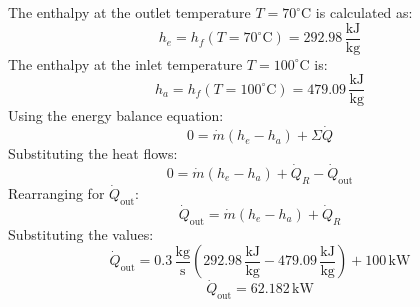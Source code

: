 The enthalpy at the outlet temperature \( T = 70^\circ\text{C} \) is calculated as:  
\[
h_e = h_f(T = 70^\circ\text{C}) = 292.98 \, \frac{\text{kJ}}{\text{kg}}
\]  
The enthalpy at the inlet temperature \( T = 100^\circ\text{C} \) is:  
\[
h_a = h_f(T = 100^\circ\text{C}) = 479.09 \, \frac{\text{kJ}}{\text{kg}}
\]  
Using the energy balance equation:  
\[
0 = \dot{m}(h_e - h_a) + \Sigma \dot{Q}
\]  
Substituting the heat flows:  
\[
0 = \dot{m}(h_e - h_a) + \dot{Q}_R - \dot{Q}_{\text{out}}
\]  
Rearranging for \( \dot{Q}_{\text{out}} \):  
\[
\dot{Q}_{\text{out}} = \dot{m}(h_e - h_a) + \dot{Q}_R
\]  
Substituting the values:  
\[
\dot{Q}_{\text{out}} = 0.3 \, \frac{\text{kg}}{\text{s}} \left(292.98 \, \frac{\text{kJ}}{\text{kg}} - 479.09 \, \frac{\text{kJ}}{\text{kg}}\right) + 100 \, \text{kW}
\]  
\[
\dot{Q}_{\text{out}} = 62.182 \, \text{kW}
\]